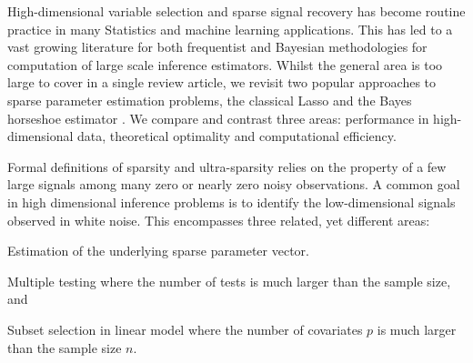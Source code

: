 \documentclass[11pt]{article}
\begin{document}


High-dimensional variable selection and sparse signal recovery has become routine practice in many Statistics and machine learning applications. This has led to a vast growing literature for both frequentist and Bayesian methodologies for computation of large scale inference estimators. Whilst the general area is too large to cover in a single review article, we revisit two popular approaches to sparse parameter estimation problems, the classical Lasso \citep{tibshirani96} and the Bayes horseshoe estimator \citep{carvalho2010horseshoe}. We compare and contrast three areas: performance in high-dimensional data, theoretical optimality and computational efficiency. 

Formal definitions of sparsity and ultra-sparsity relies on the property of a few large signals among many zero or nearly zero noisy observations. A common goal in high dimensional inference problems is to identify the low-dimensional signals observed in white noise. This encompasses three related, yet different areas: 
\ben
\item Estimation of the underlying sparse parameter vector. 
\item Multiple testing where the number of tests is much larger than the sample size, and 
\item Subset selection in linear model where the number of covariates $p$ is much larger than the sample size $n$. 
\een
\end{document}
